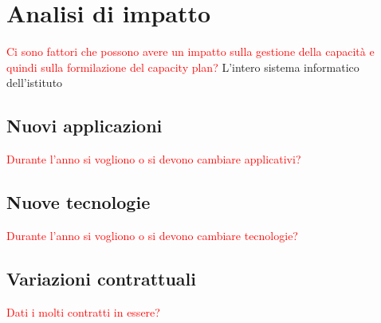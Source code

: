 \newpage

\section{Analisi di impatto} \label{ref:impatto}
	\textcolor{red}{Ci sono fattori che possono avere un impatto sulla gestione della capacità e quindi sulla formilazione del capacity plan? }
	L'intero sistema informatico dell'istituto 
	\subsection{Nuovi applicazioni}
	\textcolor{red}{Durante l'anno si vogliono o si devono cambiare applicativi?}
	\subsection{Nuove tecnologie}
	\textcolor{red}{Durante l'anno si vogliono o si devono cambiare tecnologie?}
	\subsection{Variazioni contrattuali}
	\textcolor{red}{Dati i molti contratti in essere?}
